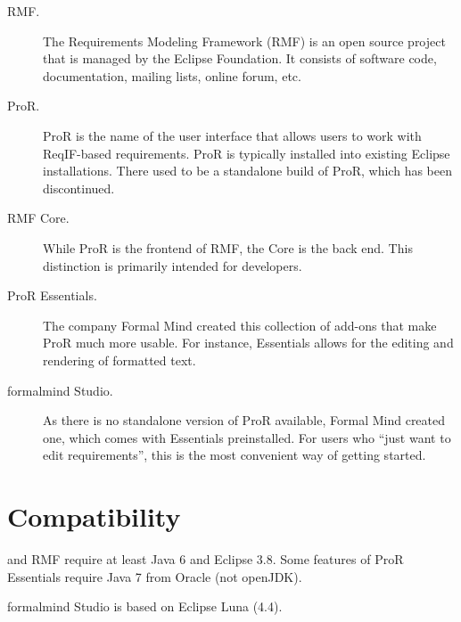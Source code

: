 \begin{description}
\item[RMF.] The Requirements Modeling Framework (RMF) is an open source project that is managed by the Eclipse Foundation.  It consists of software code, documentation, mailing lists, online forum, etc.
\item[ProR.] ProR is the name of the user interface that allows users to work with ReqIF-based requirements.  ProR is typically installed into existing Eclipse installations.  There used to be a standalone build of ProR, which has been discontinued.
\item[RMF Core.] While ProR is the frontend of RMF, the Core is the back end.  This distinction is primarily intended for developers.
\item[ProR Essentials.] The company Formal Mind created this collection of add-ons that make ProR much more usable.  For instance, Essentials allows for the editing and rendering of formatted text.
\item[formalmind Studio.] As there is no standalone version of ProR available, Formal Mind created one, which comes with Essentials preinstalled.  For users who ``just want to edit requirements'', this is the most convenient way of getting started.
\end{description}

\section{Compatibility}

\pror{} and RMF require at least Java 6 and Eclipse 3.8.  Some features of ProR Essentials require Java 7 from Oracle (not openJDK).

formalmind Studio is based on Eclipse Luna (4.4).


